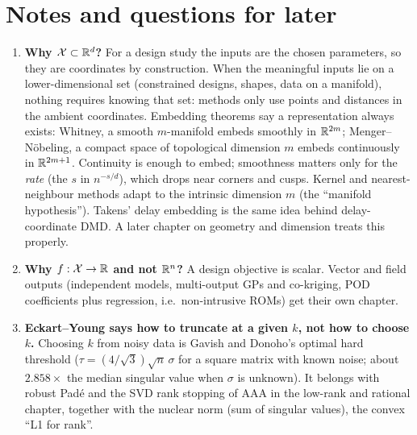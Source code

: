 \section*{Notes and questions for later}
\begin{enumerate}[leftmargin=*]
  \item \textbf{Why $\mathcal{X} \subset \mathbb{R}^d$?} For a design study the inputs are the chosen parameters, so they
        are coordinates by construction. When the meaningful inputs lie on a lower-dimensional set (constrained
        designs, shapes, data on a manifold), nothing requires knowing that set: methods only use points and
        distances in the ambient coordinates. Embedding theorems say a representation always exists: Whitney, a
        smooth $m$-manifold embeds smoothly in $\mathbb{R}^{2m}$; Menger--N\"obeling, a compact space of topological dimension
        $m$ embeds continuously in $\mathbb{R}^{2m+1}$. Continuity is enough to embed; smoothness matters only for the
        \emph{rate} (the $s$ in $n^{-s/d}$), which drops near corners and cusps. Kernel and nearest-neighbour methods
        adapt to the intrinsic dimension $m$ (the ``manifold hypothesis''). Takens' delay embedding is the same idea
        behind delay-coordinate DMD. A later chapter on geometry and dimension treats this properly.
  \item \textbf{Why $f : \mathcal{X} \to \mathbb{R}$ and not $\mathbb{R}^n$?} A design objective is scalar. Vector and field outputs
        (independent models, multi-output GPs and co-kriging, POD coefficients plus regression, i.e.\ non-intrusive
        ROMs) get their own chapter.
  \item \textbf{Eckart--Young says how to truncate at a given $k$, not how to choose $k$.} Choosing $k$ from noisy
        data is Gavish and Donoho's optimal hard threshold ($\tau = (4/\sqrt3)\sqrt n\,\sigma$ for a square matrix with
        known noise; about $2.858\times$ the median singular value when $\sigma$ is unknown). It belongs with robust
        Pad\'e and the SVD rank stopping of AAA in the low-rank and rational chapter, together with the nuclear
        norm (sum of singular values), the convex ``L1 for rank''.
\end{enumerate}

